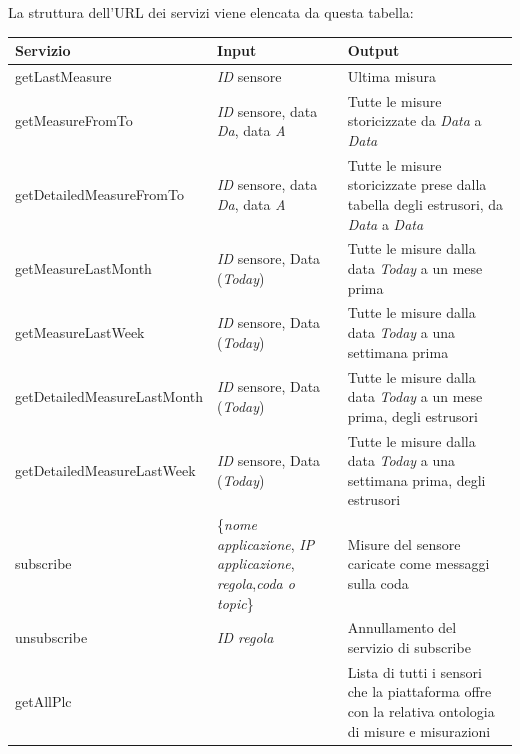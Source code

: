 La struttura dell’URL dei servizi viene elencata da questa tabella:
\begin{center}
	\begin{tabular}{ | l | p{5.06cm} | p{5.06cm} |}
		\hline
		\textbf{Servizio} & \textbf{Input} & \textbf{Output} \\ \hline
		getLastMeasure & \textit{ID} sensore & Ultima misura   \\ \hline
		getMeasureFromTo & \textit{ID} sensore, data \textit{Da}, data \textit{A} & Tutte le misure storicizzate da \textit{Data} a \textit{Data} \\ \hline
		getDetailedMeasureFromTo & \textit{ID} sensore, data \textit{Da}, data \textit{A} & Tutte le misure storicizzate prese dalla tabella degli estrusori, da \textit{Data} a \textit{Data}  \\ \hline
		getMeasureLastMonth & \textit{ID} sensore, Data (\textit{Today}) & Tutte le misure dalla data \textit{Today} a un mese prima \\ \hline
		getMeasureLastWeek & \textit{ID} sensore, Data (\textit{Today}) & Tutte le misure dalla data \textit{Today} a una settimana prima \\ \hline
		getDetailedMeasureLastMonth & \textit{ID} sensore, Data (\textit{Today}) & Tutte le misure dalla data \textit{Today} a un mese prima, degli estrusori \\ \hline
		getDetailedMeasureLastWeek & \textit{ID} sensore, Data (\textit{Today}) & Tutte le misure dalla data \textit{Today} a una settimana prima, degli estrusori \\ \hline
		subscribe & \{\textit{nome applicazione}, \textit{IP applicazione}, \textit{regola},\textit{coda o topic}\} & Misure del sensore caricate come messaggi sulla coda \\ \hline
		unsubscribe & \textit{ID regola} & Annullamento del servizio di subscribe \\ \hline
		getAllPlc & & Lista di tutti i sensori che la piattaforma offre con la relativa ontologia di misure e misurazioni \\ \hline
	\end{tabular}
\end{center}

